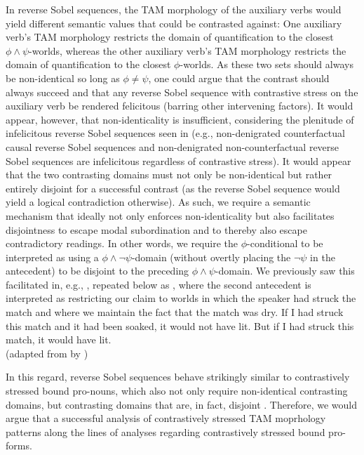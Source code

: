 In reverse Sobel sequences, the TAM morphology of the auxiliary verbs would yield different semantic values that could be contrasted against: One auxiliary verb's TAM morphology restricts the domain of quantification to the closest $\phi\land\psi$-worlds, whereas the other auxiliary verb's TAM morphology restricts the domain of quantification to the closest $\phi$-worlds. As these two sets should always be non-identical so long as $\phi\neq\psi$, one could argue that the contrast should always succeed and that any reverse Sobel sequence with contrastive stress on the auxiliary verb be rendered felicitous (barring other intervening factors). It would appear, however, that non-identicality is insufficient, considering the plenitude of infelicitous reverse Sobel sequences seen in  (e.g., non-denigrated counterfactual causal reverse Sobel sequences and non-denigrated non-counterfactual reverse Sobel sequences are infelicitous regardless of contrastive stress). It would appear that the two contrasting domains must not only be non-identical but rather entirely disjoint for a successful contrast (as the reverse Sobel sequence would yield a logical contradiction otherwise). As such, we require a semantic mechanism that ideally not only enforces non-identicality but also facilitates disjointness to escape modal subordination and to thereby also escape contradictory readings. In other words, we require the $\phi$-conditional to be interpreted as using a $\phi\land\neg\psi$-domain (without overtly placing the $\neg\psi$ in the antecedent) to be disjoint to the preceding $\phi\land\psi$-domain. We previously saw this facilitated in, e.g., , repeated below as , where the second antecedent is interpreted as restricting our claim to worlds in which the speaker had struck the match and where we maintain the fact that the match was dry.
\ex{}If I had struck this match and it had been soaked, it would not have lit. But if I had struck this match, it would have lit.\\%
\emptyfill(adapted from \textcite[p.~106]{Stalnaker1968} by \textcite[p.~487]{Lewis2018})
\xe

In this regard, reverse Sobel sequences behave strikingly similar to contrastively stressed bound pro-nouns, which also not only require non-identical contrasting domains, but contrasting domains that are, in fact, disjoint \parencite{Sauerland1998,Sauerland1999,Sauerland2000,Jacobson2000,Jacobson2004,Mayr2012}. Therefore, we would argue that a successful analysis of contrastively stressed TAM moprhology patterns along the lines of analyses regarding contrastively stressed bound pro-forms.


